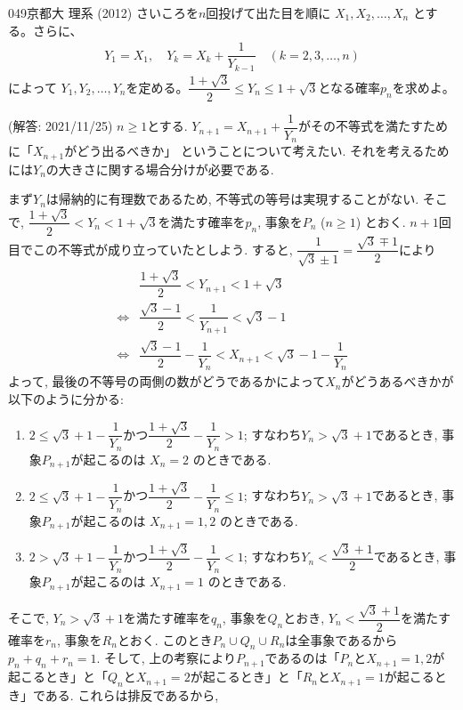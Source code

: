 \begin{prob}{049}{\maru}{京都大 理系 (2012)}
 さいころを$n$回投げて出た目を順に $X_1, X_2, \ldots, X_n$ とする。さらに、
 \begin{align*}
  Y_1=X_1,\quad Y_k=X_k+\dfrac{1}{Y_{k-1}} \quad (k=2,3,\ldots, n)
 \end{align*}
 によって $Y_1, Y_2, \ldots, Y_n$を定める。$\dfrac{1+\sqrt{3}}{2}\le Y_n \le 1+\sqrt{3}$となる確率$p_n$を求めよ。
\end{prob}
(解答: 2021/11/25)
$n\geq 1$とする.  $Y_{n+1} = X_{n+1} + \dfrac{1}{Y_n}$がその不等式を満たすために「$X_{n+1}$がどう出るべきか」 ということについて考えたい. それを考えるためには$Y_n$の大きさに関する場合分けが必要である. \par 
まず$Y_n$は帰納的に有理数であるため, 不等式の等号は実現することがない. そこで, $\dfrac{1+\sqrt{3}}{2} < Y_n < 1+\sqrt{3}$を満たす確率を$p_n$, 事象を$P_n$ ($n\geq 1$) とおく. $n+1$回目でこの不等式が成り立っていたとしよう. すると, $\dfrac{1}{\sqrt{3} \pm 1} = \dfrac{\sqrt{3}\mp 1}{2}$により
\begin{align*}
&\dfrac{1+\sqrt{3}}{2} < Y_{n+1} < 1 + \sqrt{3}\\
\iff& \dfrac{\sqrt{3}-1}{2} < \dfrac{1}{Y_{n+1}} < \sqrt{3} - 1 \\
\iff& \dfrac{\sqrt{3}-1}{2} - \dfrac{1}{Y_n} < X_{n+1} < \sqrt{3} - 1 - \dfrac{1}{Y_n}
\end{align*}
よって, 最後の不等号の両側の数がどうであるかによって$X_n$がどうあるべきかが以下のように分かる: 
\begin{enumerate}[label=(\roman*)]
\item $2\leq \sqrt{3} + 1 - \dfrac{1}{Y_n}$かつ$\dfrac{1+\sqrt{3}}{2} - \dfrac{1}{Y_n} > 1$; すなわち$Y_n > \sqrt{3}+1$であるとき, 事象$P_{n+1}$が起こるのは $X_n = 2$ のときである. 
\item $2\leq \sqrt{3} + 1 - \dfrac{1}{Y_n}$かつ$\dfrac{1+\sqrt{3}}{2} - \dfrac{1}{Y_n} \leq 1$; すなわち$Y_n > \sqrt{3}+1$であるとき, 事象$P_{n+1}$が起こるのは $X_{n+1} = 1,2$ のときである. 
\item $2> \sqrt{3} + 1 - \dfrac{1}{Y_n}$かつ$\dfrac{1+\sqrt{3}}{2} - \dfrac{1}{Y_n} < 1$; すなわち$Y_n < \dfrac{\sqrt{3}+1}{2}$であるとき, 事象$P_{n+1}$が起こるのは $X_{n+1} = 1$ のときである. 
\end{enumerate}
そこで, $Y_n > \sqrt{3}+1$を満たす確率を$q_n$, 事象を$Q_n$とおき, $Y_n < \dfrac{\sqrt{3}+1}{2}$を満たす確率を$r_n$, 事象を$R_n$とおく. このとき$P_n \cup Q_n \cup R_n$は全事象であるから$p_n + q_n + r_n = 1$. そして, 上の考察により$P_{n+1}$であるのは「$P_n$と$X_{n+1} = 1,2$が起こるとき」と「$Q_{n}$と$X_{n+1}=2$が起こるとき」と「$R_n$と$X_{n+1} = 1$が起こるとき」である. これらは排反であるから, 
